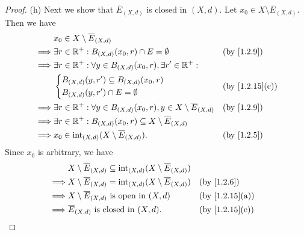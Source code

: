 \begin{proof}{(h)}
  Next we show that \(\overline{E}_{(X, d)}\) is closed in \((X, d)\).
  Let \(x_0 \in X \setminus \overline{E}_{(X, d)}\).
  Then we have
  \begin{align*}
             & x_0 \in X \setminus \overline{E}_{(X, d)}                                                                      \\
    \implies & \exists r \in \R^+ : B_{(X, d)}(x_0, r) \cap E = \emptyset                                     &  & \by{1.2.9} \\
    \implies & \exists r \in \R^+ : \forall y \in B_{(X, d)}(x_0, r), \exists r' \in \R^+ :                                   \\
             & \begin{dcases}
                 B_{(X, d)}(y, r') \subseteq B_{(X, d)}(x_0, r) \\
                 B_{(X, d)}(y, r') \cap E = \emptyset
               \end{dcases}                                              &  & \text{(by \cref{1.2.15}(c))}                    \\
    \implies & \exists r \in \R^+ : \forall y \in B_{(X, d)}(x_0, r), y \in X \setminus \overline{E}_{(X, d)} &  & \by{1.2.9} \\
    \implies & \exists r \in \R^+ : B_{(X, d)}(x_0, r) \subseteq X \setminus \overline{E}_{(X, d)}                            \\
    \implies & x_0 \in \text{int}_{(X, d)}(X \setminus \overline{E}_{(X, d)}).                                &  & \by{1.2.5}
  \end{align*}
  Since \(x_0\) is arbitrary, we have
  \begin{align*}
             & X \setminus \overline{E}_{(X, d)} \subseteq \text{int}_{(X, d)}(X \setminus \overline{E}_{(X, d)})                                   \\
    \implies & X \setminus \overline{E}_{(X, d)} = \text{int}_{(X, d)}(X \setminus \overline{E}_{(X, d)})         &  & \by{1.2.6}                   \\
    \implies & X \setminus \overline{E}_{(X, d)} \text{ is open in } (X, d)                                       &  & \text{(by \cref{1.2.15}(a))} \\
    \implies & \overline{E}_{(X, d)} \text{ is closed in } (X, d).                                                &  & \text{(by \cref{1.2.15}(e))}
  \end{align*}


\end{proof}
